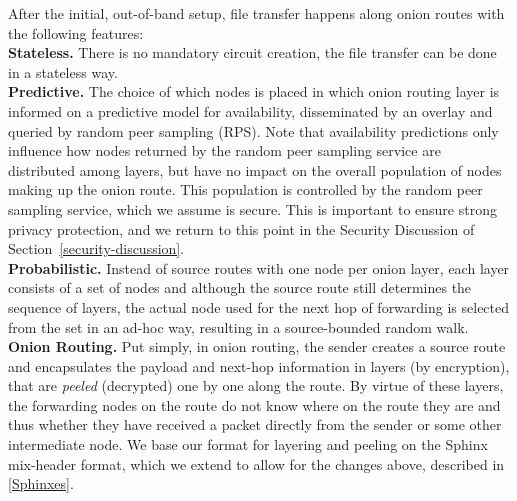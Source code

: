 After the initial, out-of-band setup, file transfer happens along
onion routes with the following features:\\
\textbf{Stateless.} There is no mandatory circuit creation, the file transfer can be
  done in a stateless way. \\
 \textbf{Predictive.} The choice of which nodes is placed in which onion routing
  layer is informed on a predictive model for availability, disseminated
  by an overlay and queried by random peer sampling (RPS). Note that availability predictions only influence how nodes returned by the random peer sampling service are distributed among layers, but have no impact on the overall population of nodes making up the onion route. This population is controlled by the random peer sampling service, which we assume is secure. This is important to ensure strong privacy protection, and we return to this point in the Security Discussion of Section~\ref{security-discussion}.\\
 \textbf{Probabilistic.} Instead of source routes with one node per onion layer, each
  layer consists of a set of nodes and although the source route still
  determines the sequence of layers, the actual node used for the next
  hop of forwarding is selected from the set in an ad-hoc way,
  resulting in a source-bounded random walk.\\
 \textbf{Onion Routing.} Put simply, in onion routing, the sender creates
  a source route and encapsulates the payload and next-hop information in layers (by
  encryption), that are \emph{peeled} (decrypted) one by one along the
  route. By virtue of these layers, the forwarding nodes on the
  route do not know where on the route they are and thus whether they
  have received a packet directly from the sender or some other
  intermediate node. We base our format for layering and peeling on the
  \ac{Sphinx} mix-header format, which we extend to allow for the
  changes above, described in \cref{Sphinxes}.

